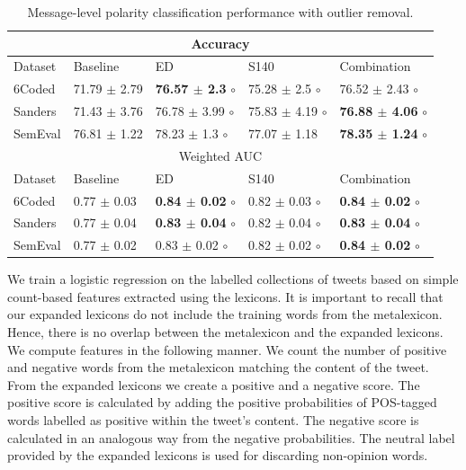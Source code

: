 \documentclass{sig-alternate}
\begin{document}
\begin{table}[htbp]
\begin{center}
\begin{tabular}{l|l|l|l|l}
\hline
\hline
\multicolumn{5}{c}{Accuracy } \\ \hline \hline
Dataset & Baseline & ED & S140 &  Combination \\ \hline
6Coded & 71.79 $\pm$ 2.79 & \textbf{ 76.57 $\pm$ 2.3} $\circ$ & 75.28 $\pm$ 2.5 $\circ$ & 76.52 $\pm$ 2.43 $\circ$ \\ 
Sanders & 71.43 $\pm$ 3.76 & 76.78 $\pm$ 3.99 $\circ$ & 75.83 $\pm$ 4.19 $\circ$  & \textbf{76.88 $\pm$ 4.06} $\circ$ \\ 
SemEval & 76.81 $\pm$ 1.22 & 78.23 $\pm$ 1.3 $\circ$ & 77.07 $\pm$ 1.18 & \textbf{78.35 $\pm$ 1.24} $\circ$ \\ \hline \hline
\multicolumn{ 5}{c}{Weighted AUC } \\ \hline \hline
Dataset & Baseline & ED & S140 & Combination \\ \hline 
6Coded & 0.77 $\pm$ 0.03 & \textbf{0.84 $\pm$ 0.02} $\circ$ & 0.82 $\pm$ 0.03 $\circ$ &  \textbf{0.84 $\pm$ 0.02} $\circ$ \\ 
Sanders & 0.77 $\pm$ 0.04 & \textbf{0.83 $\pm$ 0.04} $\circ$ & 0.82 $\pm$ 0.04 $\circ$ & \textbf{0.83 $\pm$ 0.04} $\circ$ \\ 
SemEval & 0.77 $\pm$ 0.02 & 0.83 $\pm$ 0.02 $\circ$ & 0.82 $\pm$ 0.02 $\circ$  & \textbf{0.84 $\pm$ 0.02} $\circ$ \\ \hline
\end{tabular}
\caption{Message-level polarity classification performance with outlier removal.}
\label{tab:messclassout}
\end{center}
\end{table}



We train a logistic regression on the labelled collections of tweets  based on simple count-based features extracted using the lexicons. It is important to recall that our expanded lexicons do not include the training words from the metalexicon. Hence, there is no overlap between the metalexicon and the expanded lexicons. We compute features in the following manner. We count the number of positive and negative words from the metalexicon  matching the content of the tweet. From the expanded lexicons we create a positive and a negative score. The positive score is calculated by adding the positive probabilities of POS-tagged words labelled as positive within the tweet's content. The negative score is calculated in an analogous way from the negative probabilities. The neutral label provided by the expanded lexicons is used for discarding non-opinion words. 
\end{document}
